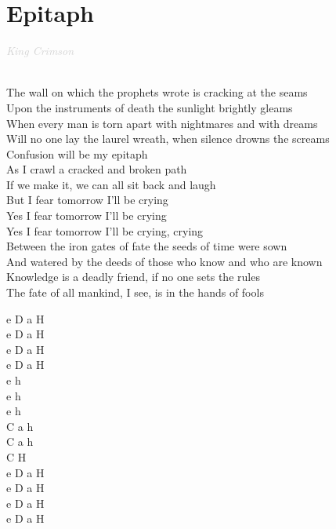 \documentclass[a5paper, 10pt]{book}
\begin{document}
\section{Epitaph}\textcolor{lightgray}{\textit{King Crimson}}\\~\\
\begin{minipage}[t]{0.8\textwidth}
The wall on which the prophets wrote is cracking at the seams\\
Upon the instruments of death the sunlight brightly gleams\\
When every man is torn apart with nightmares and with dreams\\
Will no one lay the laurel wreath, when silence drowns the screams\\

\hspace*{5mm}Confusion will be my epitaph\\
\hspace*{5mm}As I crawl a cracked and broken path\\
\hspace*{5mm}If we make it, we can all sit back and laugh\\
\hspace*{5mm}But I fear tomorrow I’ll be crying\\
\hspace*{5mm}Yes I fear tomorrow I’ll be crying\\
\hspace*{5mm}Yes I fear tomorrow I’ll be crying, crying\\

Between the iron gates of fate the seeds of time were sown\\
And watered by the deeds of those who know and who are known\\
Knowledge is a deadly friend, if no one sets the rules\\
The fate of all mankind, I see, is in the hands of fools\\
\end{minipage}
\begin{minipage}[t]{0.2\textwidth}
 e D a H\\
 e D a H\\
 e D a H\\
 e D a H\\
 
 e h\\
 e h\\
 e h\\
 C a h\\
 C a h\\
 C H\\

  e D a H\\
 e D a H\\
 e D a H\\
 e D a H\\
\end{minipage}
\end{document}
